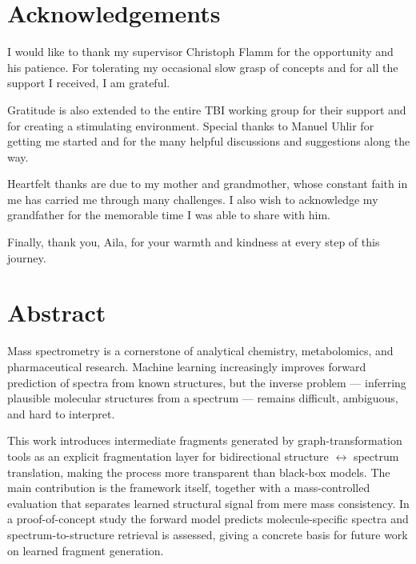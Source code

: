 \chapter*{Acknowledgements}
\renewcommand{\baselinestretch}{\linespacing}
\small\normalsize

I would like to thank my supervisor Christoph Flamm for the opportunity and his patience.
For tolerating my occasional slow grasp of concepts and for all the support I received, I am grateful.

Gratitude is also extended to the entire TBI working group for their support and for creating a stimulating environment. Special thanks to Manuel Uhlir for getting me started and for the many helpful discussions and suggestions along the way.

Heartfelt thanks are due to my mother and grandmother, whose constant faith in me has carried me through many challenges. I also wish to acknowledge my grandfather for the memorable time I was able to share with him.

Finally, thank you, Aila, for your warmth and kindness at every step of this journey.

\newpage
{}
\renewcommand{\baselinestretch}{1.3}\normalsize
\tableofcontents
\renewcommand{\baselinestretch}{1.5}\normalsize
\clearpage
\chapter*{Abstract}

Mass spectrometry is a cornerstone of analytical chemistry, metabolomics, and pharmaceutical research. Machine learning increasingly improves forward prediction of spectra from known structures, but the inverse problem --- inferring plausible molecular structures from a spectrum --- remains difficult, ambiguous, and hard to interpret.

This work introduces intermediate fragments generated by graph-transformation tools as an explicit fragmentation layer for bidirectional structure $\leftrightarrow$ spectrum translation, making the process more transparent than black-box models.
The main contribution is the framework itself, together with a mass-controlled evaluation that separates learned structural signal from mere mass consistency.
In a proof-of-concept study the forward model predicts molecule-specific spectra and spectrum-to-structure retrieval is assessed, giving a concrete basis for future work on learned fragment generation.

